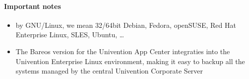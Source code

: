 \paragraph{Important notes}

\begin{itemize}
    \item by GNU/Linux, we mean 32/64bit Debian, Fedora, openSUSE, Red Hat Enterprise Linux, SLES, Ubuntu, \dots
    \item {The Bareos version for the Univention App Center integraties into the Univention Enterprise Linux environment, making it easy to backup all the systems managed by the central Univention Corporate Server}
\end{itemize}

